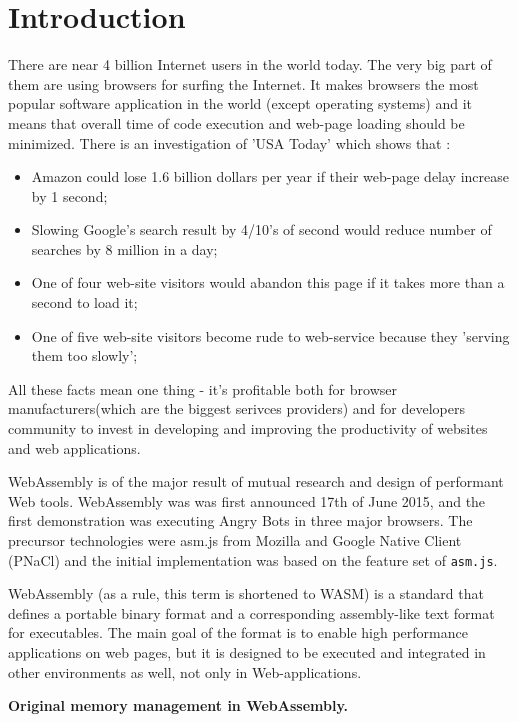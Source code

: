 \chapter*{Introduction}

There are near 4 billion Internet users in the world today. The very big part of them are using browsers for surfing the Internet.
It makes browsers the most popular software application in the world (except operating systems) and it means that overall time of code execution and web-page loading should be minimized. There is an investigation of 'USA Today' which shows that :

\begin{itemize}
 \item Amazon could lose 1.6 billion dollars per year if their web-page delay increase by 1 second;
 \item Slowing Google's search result by 4/10's of second would reduce number of searches by 8 million in a day;
 \item One of four web-site visitors would abandon this page if it takes more than a second to load it;
 \item One of five web-site visitors become rude to web-service because they 'serving them too slowly';
\end{itemize}

All these facts mean one thing - it’s profitable both for browser manufacturers(which are the biggest serivces providers) and for developers community to invest in developing and improving the productivity of websites and web applications.

WebAssembly is of the major result of mutual research and design of performant Web tools. WebAssembly was  was first announced 17th of June 2015, and the first demonstration was executing Angry Bots in three major browsers.
The precursor technologies were asm.js from Mozilla and Google Native Client (PNaCl) and the initial implementation was based on the feature set of \texttt{asm.js}. \cite{Wiki_Wasm}

WebAssembly (as a rule, this term is shortened to WASM) is a standard that defines a portable binary format and a corresponding assembly-like text format for executables. The main goal of the format is to enable high performance applications on web pages, 
but it is designed to be executed and integrated in other environments as well, not only in Web-applications. \cite{Wiki_Wasm}

\textbf{Original memory management in WebAssembly.}


